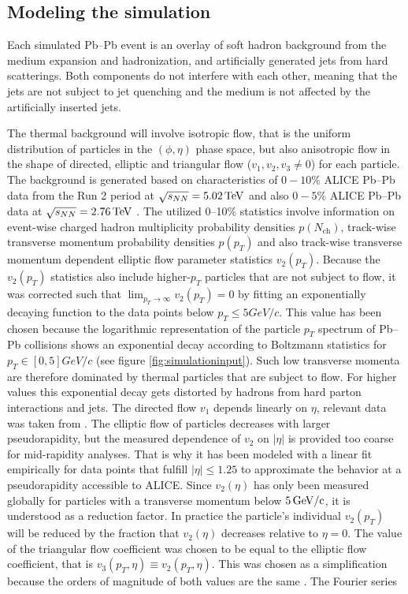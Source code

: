 \documentclass[
  a4paper,
  12pt,
  oneside,
  parskip=half,
  listof=totoc,
  bibliography=totoc,
  DIV=12,
  numbers=noenddot,
  BA.tex
  ]{subfiles}
\begin{document}
\subsection{Modeling the simulation}

Each simulated Pb--Pb event is an overlay of soft hadron background from the medium expansion and hadronization, and artificially generated jets from hard scatterings. Both components do not interfere with each other, meaning that the jets are not subject to jet quenching and the medium is not affected by the artificially inserted jets.

The thermal background will involve isotropic flow, that is the uniform distribution of particles in the $(\phi, \eta)$ phase space, but also anisotropic flow in the shape of directed, elliptic and triangular flow ($v_1, v_2, v_3 \neq 0$) for each particle. The background is generated based on characteristics of $0-10\%$ ALICE Pb--Pb data from the Run 2 period at $\sqrt{s_{NN}} = 5.02\bunit{TeV}$ \cite{nadine_alice_grunwald_studies_2022} and also $0-5\%$ ALICE Pb--Pb data at $\sqrt{s_{NN}} = 2.76\bunit{TeV}$ \cite{collaboration_pseudorapidity_2016}. The utilized 0--10\% statistics involve information on event-wise charged hadron multiplicity probability densities $p(N_\text{ch})$, track-wise transverse momentum probability densities $p(p_T)$ and also track-wise transverse momentum dependent elliptic flow parameter statistics $v_2(p_T)$. Because the $v_2(p_T)$ statistics also include higher-$p_T$ particles that are not subject to flow, it was corrected such that $\lim_{p_T \rightarrow \infty}  v_2(p_T) = 0$ by fitting an exponentially decaying function to the data points below $p_T \leq 5\unit{GeV/c}$. This value has been chosen because the logarithmic representation of the particle $p_T$ spectrum of Pb--Pb collisions shows an exponential decay according to Boltzmann statistics for $p_T \in [0, 5]\unit{GeV/c}$ (see figure \ref{fig:simulationinput}). Such low transverse momenta are therefore dominated by thermal particles that are subject to flow. For higher values this exponential decay gets distorted by hadrons from hard parton interactions and jets. The directed flow $v_1$ depends linearly on $\eta$, relevant data was taken from \cite{selyuzhenkov_charged_2011}. The elliptic flow of particles decreases with larger pseudorapidity, but the measured dependence of $v_2$ on $|\eta|$ is provided too coarse for mid-rapidity analyses\cite[Figure 1, $v_2\{2\}$ for 0--5\%,][]{collaboration_pseudorapidity_2016}. That is why it has been modeled with a linear fit empirically for data points that fulfill $|\eta| \leq 1.25$ to approximate the behavior at a pseudorapidity accessible to ALICE. Since $v_2(\eta)$ has only been measured globally for particles with a transverse momentum below $5\bunit{GeV/c}$, it is understood as a reduction factor. In practice the particle's individual $v_2(p_T)$ will be reduced by the fraction that $v_2(\eta)$ decreases relative to $\eta = 0$. The value of the triangular flow coefficient was chosen to be equal to the elliptic flow coefficient, that is $v_3(p_T, \eta) \equiv v_2(p_T, \eta)$. This was chosen as a simplification because the orders of magnitude of both values are the same \cite{alqahtani_understanding_2026}. The Fourier series 
\end{document}

